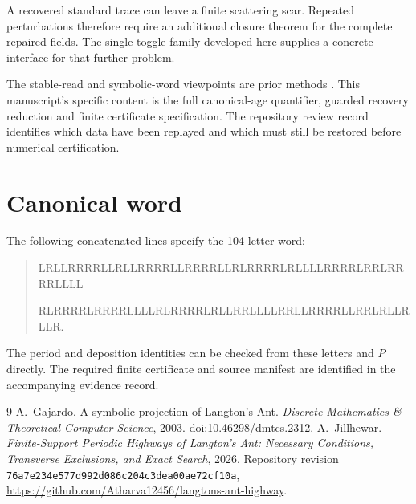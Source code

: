 \documentclass[11pt]{article}
\begin{document}
A recovered standard trace can leave a finite scattering scar. Repeated
perturbations therefore require an additional closure theorem for the
complete repaired fields. The single-toggle family developed here supplies
a concrete interface for that further problem.

The stable-read and symbolic-word viewpoints are prior methods
\cite{gajardo,jillhewar}. This manuscript's specific content is the full
canonical-age quantifier, guarded recovery reduction and finite certificate
specification. The repository review record identifies which data have been
replayed and which must still be restored before numerical certification.

\appendix
\section{Canonical word}
The following concatenated lines specify the 104-letter word:
\begin{quote}\ttfamily\small
LRLLRRRRLLRLLRRRRLLRRRRLLRLRRRRLRLLLLRRRRLRRLRRRRLLLL\par
RLRRRRLRRRRLLLLRLRRRRLRLLRRLLLLRRLLRRRRLLRRLRLLRLLR.
\end{quote}
The period and deposition identities can be checked from these letters and
$P$ directly. The required finite certificate and source manifest are
identified in the accompanying evidence record.

\begin{thebibliography}{9}
 A.~Gajardo. A symbolic projection of Langton's Ant.
\emph{Discrete Mathematics \& Theoretical Computer Science}, 2003.
\href{https://doi.org/10.46298/dmtcs.2312}{doi:10.46298/dmtcs.2312}.
 A.~Jillhewar. \emph{Finite-Support Periodic Highways of
Langton's Ant: Necessary Conditions, Transverse Exclusions, and Exact Search},
2026. Repository revision \texttt{76a7e234e577d992d086c204c3dea00ae72cf10a},
\url{https://github.com/Atharva12456/langtons-ant-highway}.
\end{thebibliography}
\end{document}
